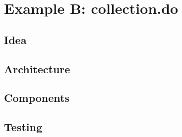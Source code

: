 \chapter{Example B: collection.do}
\label{ch:collection}

\section{Idea}
\section{Architecture}
\section{Components}
\section{Testing}